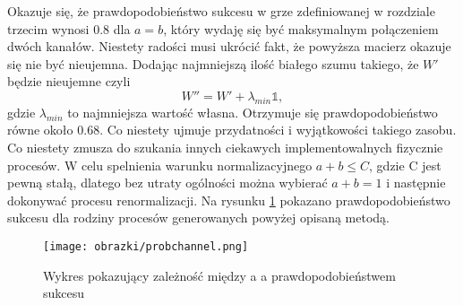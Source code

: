 \documentclass[10pt]{article} %
\newcommand{\I}{\mathbb{1}}
\begin{document}
Okazuje się, że prawdopodobieństwo sukcesu w grze zdefiniowanej w rozdziale trzecim wynosi $0.8$ dla $a=b$, który wydaję się być maksymalnym połączeniem dwóch kanałów.
Niestety radości musi ukrócić fakt, że powyższa macierz okazuje się nie być nieujemna. Dodając najmniejszą ilość białego szumu takiego, że $W'$ będzie nieujemne czyli
\begin{equation}
W'' = W' + \lambda_{min} \I,
\end{equation} gdzie $\lambda_{min}$ to najmniejsza wartość własna.
Otrzymuje się prawdopodobieństwo równe około $0.68$. Co niestety ujmuje przydatności i wyjątkowości takiego zasobu. Co niestety zmusza do szukania innych ciekawych implementowalnych fizycznie procesów.
W celu spelnienia warunku normalizacyjnego $a + b \leq C$, gdzie C jest pewną stałą, dlatego bez utraty ogólności można wybierać $a + b = 1$ i następnie dokonywać procesu renormalizacji. Na rysunku \ref{fig:bichannel} pokazano prawdopodobieństwo sukcesu dla rodziny procesów generowanych powyżej opisaną metodą.
\begin{figure}[th]
\centering

\texttt{[image: obrazki/probchannel.png]}
\caption{Wykres pokazujący zależność między a a prawdopodobieństwem sukcesu}
\label{fig:bichannel}
\end{figure}
\end{document}
